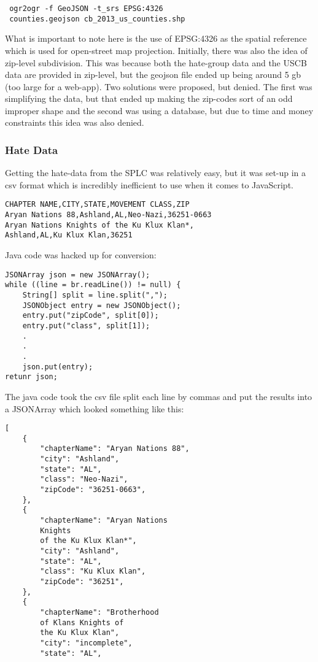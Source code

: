 \documentclass[twoside]{article}
\begin{document}
\begin{multicols}{2}
\begin{verbatim}
 ogr2ogr -f GeoJSON -t_srs EPSG:4326 
 counties.geojson cb_2013_us_counties.shp
\end{verbatim}
What is important to note here is the use of EPSG:4326 as the spatial reference which is used for open-street map projection.
Initially, there was also the idea of zip-level subdivision. This was because both the hate-group data and the USCB data are provided in zip-level, but the geojson file ended up being around 5 gb (too large for a web-app). Two solutions were proposed, but denied. The first was simplifying the data, but that ended up making the zip-codes sort of an odd improper shape and the second was using a database, but due to time and money constraints this idea was also denied. 

\subsubsection{Hate Data}
Getting the hate-data from the SPLC was relatively easy, but it was set-up in a csv format which is incredibly inefficient to use when it comes to JavaScript.
\begin{verbatim}
CHAPTER NAME,CITY,STATE,MOVEMENT CLASS,ZIP
Aryan Nations 88,Ashland,AL,Neo-Nazi,36251-0663
Aryan Nations Knights of the Ku Klux Klan*,
Ashland,AL,Ku Klux Klan,36251
\end{verbatim}
Java code was hacked up for conversion:
\begin{verbatim}
JSONArray json = new JSONArray();
while ((line = br.readLine()) != null) {
    String[] split = line.split(",");
    JSONObject entry = new JSONObject();
    entry.put("zipCode", split[0]);
    entry.put("class", split[1]);
    .
    .
    .
    json.put(entry);
retunr json;
\end{verbatim}
The java code took the csv file split each line by commas and put the results into a JSONArray which looked something like this:
\begin{verbatim}
[
    {
        "chapterName": "Aryan Nations 88",
        "city": "Ashland",
        "state": "AL",
        "class": "Neo-Nazi",
        "zipCode": "36251-0663",
    },
    {
        "chapterName": "Aryan Nations 
        Knights 
        of the Ku Klux Klan*",
        "city": "Ashland",
        "state": "AL",
        "class": "Ku Klux Klan",
        "zipCode": "36251",
    },
    {
        "chapterName": "Brotherhood 
        of Klans Knights of 
        the Ku Klux Klan",
        "city": "incomplete",
        "state": "AL",

\end{verbatim}
\end{multicols}
\end{document}
